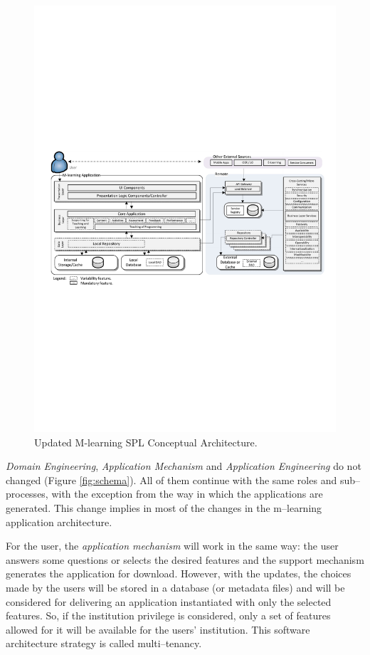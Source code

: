 \begin{figure}[!ht]
    \centering
    \includegraphics[scale=0.90]{archv7.pdf}
    \caption{Updated M-learning SPL Conceptual Architecture.}
    \label{fig:schema2}
\end{figure}

\textit{Domain Engineering}, \textit{Application Mechanism} and \textit{Application Engineering} do not changed (Figure \ref{fig:schema}). All of them continue with the same roles and sub--processes, with the exception from the way in which the applications are generated. This change implies in most of the changes in the m--learning application architecture.

For the user, the \textit{application mechanism}\cite{marcolinoarcht2017} will work in the same way: the user answers some questions or selects the desired features and the support mechanism generates the application for download. However, with the updates, the choices made by the users will be stored in a database (or metadata files) and will be considered for delivering an application instantiated with only the selected features. So, if the institution privilege is considered, only a set of features allowed for it will be available for the users' institution. This software architecture strategy is called multi--tenancy.

